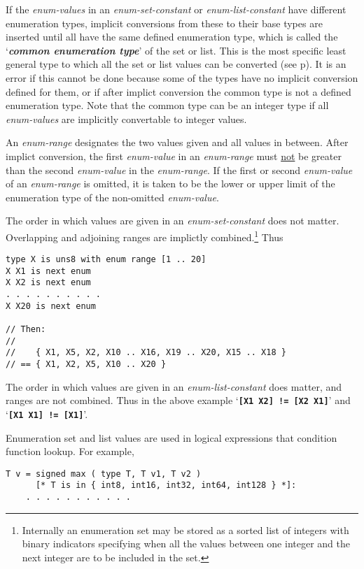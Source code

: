 \documentclass[12pt]{article}
\newcommand{\TT}[1]{{\tt \bfseries #1}}
\newcommand{\key}[1]{{\bf \em #1}\index{#1}}
\newcommand{\pagref}[1]{p\pageref{#1}}
\newenvironment{indpar}[1][0.3in]%
	{\begin{list}{}%
		     {\setlength{\itemsep}{0in}%
		      \setlength{\topsep}{0in}%
		      \setlength{\parsep}{1ex}%
		      \setlength{\labelwidth}{#1}%
		      \setlength{\leftmargin}{#1}%
		      \addtolength{\leftmargin}{\labelsep}}%
	 \item}%
	{\end{list}}
\begin{document}
If the {\em enum-values} in an {\em enum-set-constant} or
{\em enum-list-constant} have different
enumeration types, implicit conversions from these to their base types
are inserted until all have the same defined enumeration type,
which is called the
`\key{common enumeration type}'\label{COMMON-ENUMERATION-TYPE}
of the set or list.
This is the most specific least general type to which all the set
or list
values can be converted (see \pagref{CONVERSION-RELATION}).
It is an error
if this cannot be done because some of the types have no implicit
conversion defined for them, or if after implict conversion the
common type is not a defined enumeration type.
Note that the common type can be an integer type if all
{\em enum-values} are implicitly convertable to integer values.

An {\em enum-range} designates the two values given and all
values in between.
After implict conversion, the first {\em enum-value} in an {\em enum-range}
must \underline{not} be greater than the second {\em enum-value}
in the {\em enum-range}.  If the first or second {\em enum-value} of
an {\em enum-range} is omitted, it is taken to be the lower or upper
limit of the enumeration type of the non-omitted {\em enum-value}.

The order in which values are given in an {\em enum-set-constant}
does not matter.  Overlapping and adjoining ranges are implictly
combined.\footnote{Internally an enumeration set may be stored as a
sorted list of integers with binary indicators specifying when all
the values between one integer and the next integer are to be included
in the set.}
Thus
\begin{indpar}\begin{verbatim}
type X is uns8 with enum range [1 .. 20]
X X1 is next enum
X X2 is next enum
. . . . . . . . . .
X X20 is next enum

// Then:
//
//    { X1, X5, X2, X10 .. X16, X19 .. X20, X15 .. X18 }
// == { X1, X2, X5, X10 .. X20 }
\end{verbatim}\end{indpar}

The order in which values are given in an {\em enum-list-constant}
does matter, and ranges are not combined.  Thus in the above
example `\TT{[X1 X2] != [X2 X1]}' and `\TT{[X1 X1] != [X1]}'.

Enumeration set and list values are used in logical expressions that
condition function lookup.  For example,
\begin{indpar}\begin{verbatim}
T v = signed max ( type T, T v1, T v2 )
      [* T is in { int8, int16, int32, int64, int128 } *]:
    . . . . . . . . . . .
\end{verbatim}\end{indpar}
\end{document}
